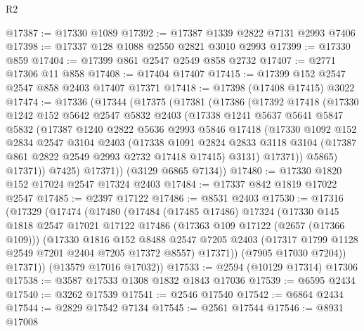 \begin{lexlean}{R2}
\begin{coremodule}
@17387 := @17330 @1089
@17392 := @17387 @1339 @2822 @7131 @2993 @7406
@17398 := @17337 @128 @1088 @2550 @2821 @3010 @2993
@17399 := @17330 @859
@17404 := @17399 @861 @2547 @2549 @858 @2732
@17407 := @2771 @17306 @11 @858
@17408 := @17404 @17407
@17415 := @17399 @152 @2547 @2547 @858 @2403 @17407 @17371
@17418 := @17398 (@17408 @17415) @3022
@17474 := @17336
    (@17344
      (@17375
        (@17381
          (@17386
            (@17392
              @17418
              (@17330
                @1242
                @152
                @5642
                @2547
                @5832
                @2403
                (@17338
                  @1241
                  @5637
                  @5641
                  @5847
                  @5832
                  (@17387
                    @1240
                    @2822
                    @5636
                    @2993
                    @5846
                    @17418
                    (@17330
                      @1092
                      @152
                      @2834
                      @2547
                      @3104
                      @2403
                      (@17338
                        @1091
                        @2824
                        @2833
                        @3118
                        @3104
                        (@17387 @861 @2822 @2549 @2993 @2732 @17418 @17415)
                        @3131)
                      @17371))
                  @5865)
                @17371))
            @7425)
          @17371))
      (@3129 @6865 @7134))
@17480 := @17330 @1820 @152 @17024 @2547 @17324 @2403
@17484 := @17337 @842 @1819 @17022 @2547
@17485 := @2397 @17122
@17486 := @8531 @2403
@17530 := @17316
    (@17329
      (@17474
        (@17480
          (@17484
            (@17485 @17486)
            @17324
            (@17330
              @145
              @1818
              @2547
              @17021
              @17122
              @17486
              (@17363 @109 @17122 (@2657 (@17366 @109)))
              (@17330
                @1816
                @152
                @8488
                @2547
                @7205
                @2403
                (@17317 @1799 @1128 @2549 @7201 @2404 @7205 @17372 @8557)
                @17371))
            (@7905 @17030 @7204))
          @17371))
      (@13579 @17016 @17032))
@17533 := @2594 (@10129 @17314) @17306
@17538 := @3587 @17533 @1308 @1832 @1843 @17036
@17539 := @6595 @2434
@17540 := @3262 @17539
@17541 := @2546 @17540
@17542 := @6864 @2434
@17544 := @2829 @17542 @7134
@17545 := @2561 @17544
@17546 := @8931 @17008

\end{coremodule}
\end{lexlean}
